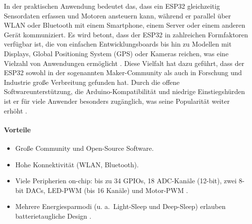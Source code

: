 In der praktischen Anwendung bedeutet das, dass ein ESP32 gleichzeitig Sensordaten erfassen und Motoren ansteuern kann, während er parallel über WLAN oder Bluetooth mit einem Smartphone, einem Server oder einem anderen Gerät kommuniziert. Es wird betont, dass der ESP32 in zahlreichen Formfaktoren verfügbar ist, die von einfachen Entwicklungsboards bis hin zu Modellen mit Displays, Global Positioning System (GPS) oder Kameras reichen, was eine Vielzahl von Anwendungen ermöglicht \autocite{Cameron2023}. Diese Vielfalt hat dazu geführt, dass der ESP32 sowohl in der sogenannten Maker-Community als auch in Forschung und Industrie große Verbreitung gefunden hat. Durch die offene Softwareunterstützung, die Arduino-Kompatibilität und niedrige Einstiegshürden ist er für viele Anwender besonders zugänglich, was seine Popularität weiter erhöht \autocite{Cameron2023}.

\paragraph{Vorteile}
\begin{itemize}
	\item Große Community und Open-Source Software.
	\item Hohe Konnektivität (WLAN, Bluetooth).
	\item Viele Peripherien on-chip: bis zu 34 GPIOs, 18 ADC-Kanäle (12-bit), zwei 8-bit DACs, LED-PWM (bis 16 Kanäle) und Motor-PWM \autocite{EspressifESP32Datasheet}. %
	\item Mehrere Energiesparmodi (u. a.\ Light-Sleep und Deep-Sleep) erlauben batterietaugliche Design \autocite{EspressifESP32Datasheet}. %
\end{itemize}

